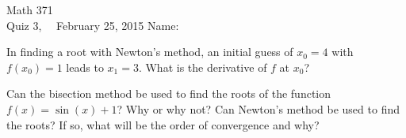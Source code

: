 \documentclass[addpoints, 11pt]{exam}
\begin{document}
Math 371 \\
Quiz 3, \ \ February 25, 2015
\hspace{2.in}
{Name:} {\underline {\hspace{2.15in}}} \\ \normalsize
\begin{questions}

\question In finding a root with Newton's method, an initial guess of $x_0=4$ with $f(x_0)=1$ leads to $x_1=3$. What is the derivative of $f$ at $x_0$? \vfill

\question Can the bisection method be used to find the roots of the function $f(x)=\sin(x)+1$? Why or why not? Can Newton's method be used to find the roots? If so, what will be the order of convergence and why? \vfill

\end{questions}
\end{document}
